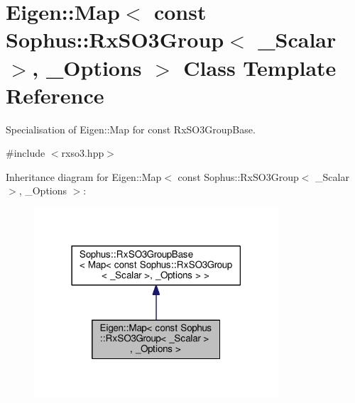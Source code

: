 \hypertarget{class_eigen_1_1_map_3_01const_01_sophus_1_1_rx_s_o3_group_3_01___scalar_01_4_00_01___options_01_4}{}\section{Eigen\+:\+:Map$<$ const Sophus\+:\+:Rx\+S\+O3\+Group$<$ \+\_\+\+Scalar $>$, \+\_\+\+Options $>$ Class Template Reference}
\label{class_eigen_1_1_map_3_01const_01_sophus_1_1_rx_s_o3_group_3_01___scalar_01_4_00_01___options_01_4}


Specialisation of Eigen\+::\+Map for const Rx\+S\+O3\+Group\+Base.  




{\ttfamily \#include $<$rxso3.\+hpp$>$}



Inheritance diagram for Eigen\+:\+:Map$<$ const Sophus\+:\+:Rx\+S\+O3\+Group$<$ \+\_\+\+Scalar $>$, \+\_\+\+Options $>$\+:
\nopagebreak
\begin{figure}[H]
\begin{center}
\leavevmode
\includegraphics[width=258pt]{class_eigen_1_1_map_3_01const_01_sophus_1_1_rx_s_o3_group_3_01___scalar_01_4_00_01___options_01_4__inherit__graph}
\end{center}
\end{figure}


